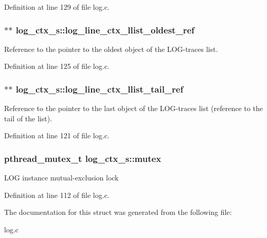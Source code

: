 Definition at line 129 of file log.\+c.

\subsubsection[{\texorpdfstring{log\+\_\+line\+\_\+ctx\+\_\+llist\+\_\+oldest\+\_\+ref}{log_line_ctx_llist_oldest_ref}}]{$\ast$$\ast$ log\+\_\+ctx\+\_\+s\+::log\+\_\+line\+\_\+ctx\+\_\+llist\+\_\+oldest\+\_\+ref}\hypertarget{structlog__ctx__s_a8f6f89d568b21e624a2e30f023c96e2c}{}\label{structlog__ctx__s_a8f6f89d568b21e624a2e30f023c96e2c}
Reference to the pointer to the oldest object of the L\+O\+G-\/traces list. 

Definition at line 125 of file log.\+c.

\subsubsection[{\texorpdfstring{log\+\_\+line\+\_\+ctx\+\_\+llist\+\_\+tail\+\_\+ref}{log_line_ctx_llist_tail_ref}}]{$\ast$$\ast$ log\+\_\+ctx\+\_\+s\+::log\+\_\+line\+\_\+ctx\+\_\+llist\+\_\+tail\+\_\+ref}\hypertarget{structlog__ctx__s_aeb3572f72559503e327e99525d28ca85}{}\label{structlog__ctx__s_aeb3572f72559503e327e99525d28ca85}
Reference to the pointer to the last object of the L\+O\+G-\/traces list (reference to the tail of the list). 

Definition at line 121 of file log.\+c.

\subsubsection[{\texorpdfstring{mutex}{mutex}}]{\setlength{\rightskip}{0pt plus 5cm}pthread\+\_\+mutex\+\_\+t log\+\_\+ctx\+\_\+s\+::mutex}\hypertarget{structlog__ctx__s_a4b1f68253562a2a0bb7f40f8d9f51aee}{}\label{structlog__ctx__s_a4b1f68253562a2a0bb7f40f8d9f51aee}
L\+OG instance mutual-\/exclusion lock 

Definition at line 112 of file log.\+c.



The documentation for this struct was generated from the following file\+:\begin{DoxyCompactItemize}
\item 
log.\+c\end{DoxyCompactItemize}
